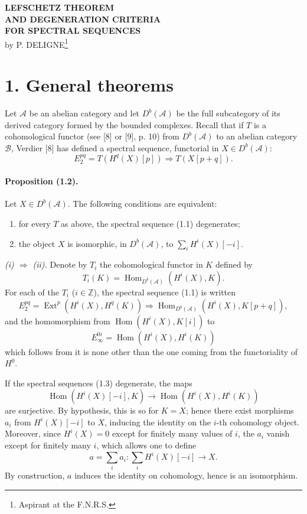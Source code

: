\documentclass[10pt]{article}
\newcommand{\Acal}{\mathcal A}
\newcommand{\Bcal}{\mathcal B}
\newcommand{\Z}{\mathbb Z}
\newcommand{\Db}{D^b}
\newcommand{\Hom}{\operatorname{Hom}}
\newcommand{\Ext}{\operatorname{Ext}}
\begin{document}
\begin{center}
{\Large\bfseries LEFSCHETZ THEOREM\\
AND DEGENERATION CRITERIA\\
FOR SPECTRAL SEQUENCES}\\[0.6em]
by P. DELIGNE\footnote{Aspirant at the F.N.R.S.}
\end{center}

\section*{1. General theorems}

Let $\Acal$ be an abelian category and let $\Db(\Acal)$ be the full subcategory of its derived category formed by the bounded complexes. Recall that if $T$ is a cohomological functor (see [8] or [9], p. 10) from $\Db(\Acal)$ to an abelian category $\Bcal$, Verdier [8] has defined a spectral sequence, functorial in $X\in\Db(\Acal)$:
\[
\tag{1.1}
E_2^{pq}=T(H^q(X)[p])\Longrightarrow T(X[p+q]).
\]

\paragraph{Proposition (1.2).} Let $X\in\Db(\Acal)$. The following conditions are equivalent:
\begin{enumerate}[label=(\roman*)]
\item for every $T$ as above, the spectral sequence (1.1) degenerates;
\item the object $X$ is isomorphic, in $\Db(\Acal)$, to $\sum_i H^i(X)[-i]$.
\end{enumerate}

\emph{(i) $\Rightarrow$ (ii).} Denote by $T_i$ the cohomological functor in $K$ defined by
\[
T_i(K)=\Hom_{\Db(\Acal)}(H^i(X),K).
\]
For each of the $T_i$ ($i\in\Z$), the spectral sequence (1.1) is written
\[
\tag{1.3}
E_2^{pq}=\Ext^p(H^i(X),H^q(K))\Longrightarrow
\Hom_{\Db(\Acal)}(H^i(X),K[p+q]),
\]
and the homomorphism from $\Hom(H^i(X),K[i])$ to
\[
E_\infty^{0i}=\Hom(H^i(X),H^i(K))
\]
which follows from it is none other than the one coming from the functoriality of $H^0$.

If the spectral sequences (1.3) degenerate, the maps
\[
\Hom(H^i(X)[-i],K)\longrightarrow \Hom(H^i(X),H^i(K))
\]
are surjective. By hypothesis, this is so for $K=X$; hence there exist morphisms $a_i$ from $H^i(X)[-i]$ to $X$, inducing the identity on the $i$-th cohomology object. Moreover, since $H^i(X)=0$ except for finitely many values of $i$, the $a_i$ vanish except for finitely many $i$, which allows one to define
\[
a=\sum_i a_i:\sum_i H^i(X)[-i]\longrightarrow X.
\]
By construction, $a$ induces the identity on cohomology, hence is an isomorphism.
\end{document}
